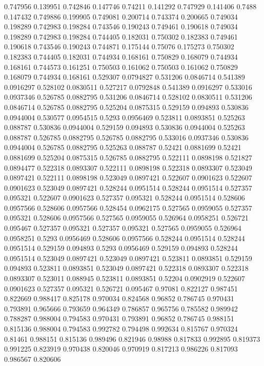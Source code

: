 0.747956 0.139951
0.742846 0.147746
0.74211 0.141292
0.747929 0.141406
0.7488 0.147432
0.749886 0.199905
0.749081 0.200714
0.743374 0.200665
0.749034 0.198289
0.742983 0.198284
0.743546 0.190243
0.749461 0.190618
0.749034 0.198289
0.742983 0.198284
0.744405 0.182031
0.750302 0.182383
0.749461 0.190618
0.743546 0.190243
0.744871 0.175144
0.75076 0.175273
0.750302 0.182383
0.744405 0.182031
0.744934 0.168161
0.750829 0.168079
0.744934 0.168161
0.744573 0.161251
0.750503 0.161062
0.750503 0.161062
0.750829 0.168079
0.744934 0.168161
0.529307 0.0794827
0.531206 0.0846714
0.541389 0.0916297
0.528102 0.0830511
0.527217 0.0792848
0.541389 0.0916297
0.533016 0.0937346
0.526785 0.0882795
0.531206 0.0846714
0.528102 0.0830511
0.531206 0.0846714
0.526785 0.0882795
0.525204 0.0875315
0.529159 0.094893
0.530836 0.0944004
0.530577 0.0954515
0.5293 0.0956469
0.523811 0.0893851
0.525263 0.088787
0.530836 0.0944004
0.529159 0.094893
0.530836 0.0944004
0.525263 0.088787
0.526785 0.0882795
0.526785 0.0882795
0.533016 0.0937346
0.530836 0.0944004
0.526785 0.0882795
0.525263 0.088787
0.52421 0.0881699
0.52421 0.0881699
0.525204 0.0875315
0.526785 0.0882795
0.522111 0.0898198
0.521827 0.0894477
0.522318 0.0893307
0.522111 0.0898198
0.522318 0.0893307
0.523049 0.0897421
0.522111 0.0898198
0.523049 0.0897421
0.522607 0.0901623
0.522607 0.0901623
0.523049 0.0897421
0.528244 0.0951514
0.528244 0.0951514
0.527357 0.095321
0.522607 0.0901623
0.527357 0.095321
0.528244 0.0951514
0.528606 0.0957566
0.528606 0.0957566
0.528454 0.0962175
0.527565 0.0959055
0.527357 0.095321
0.528606 0.0957566
0.527565 0.0959055
0.526964 0.0958251
0.526721 0.095467
0.527357 0.095321
0.527357 0.095321
0.527565 0.0959055
0.526964 0.0958251
0.5293 0.0956469
0.528606 0.0957566
0.528244 0.0951514
0.528244 0.0951514
0.529159 0.094893
0.5293 0.0956469
0.529159 0.094893
0.528244 0.0951514
0.523049 0.0897421
0.523049 0.0897421
0.523811 0.0893851
0.529159 0.094893
0.523811 0.0893851
0.523049 0.0897421
0.522318 0.0893307
0.522318 0.0893307
0.523011 0.088945
0.523811 0.0893851
0.52204 0.0902919
0.522607 0.0901623
0.527357 0.095321
0.526721 0.095467
0.97081 0.822127
0.987451 0.822669
0.988417 0.825178
0.970034 0.824568
0.96852 0.786745
0.970431 0.793891
0.965666 0.793659
0.964349 0.786857
0.965756 0.785582
0.989942 0.788287
0.988004 0.794583
0.970431 0.793891
0.96852 0.786745
0.988151 0.815136
0.988004 0.794583
0.992782 0.794498
0.992634 0.815767
0.970324 0.81461
0.988151 0.815136
0.989496 0.821946
0.98988 0.817833
0.992895 0.819373
0.991225 0.823919
0.970438 0.820046
0.970919 0.817213
0.986226 0.817093
0.986567 0.820606

